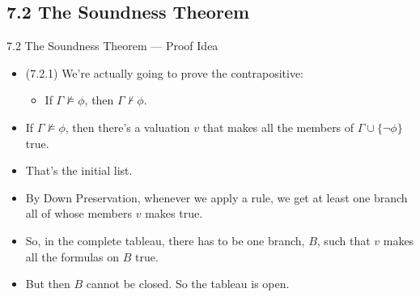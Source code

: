 \documentclass[../slides.tex]{subfiles}
\begin{document}
\subsection{7.2 The Soundness Theorem}

\begin{frame}{7.2 The Soundness Theorem --- Proof Idea}

	\begin{itemize}

		\item (7.2.1) We're actually going to prove the contrapositive:
		
			\begin{itemize}
			
				\item If $\Gamma\nvDash\phi$, then $\Gamma\nvdash\phi$.
			
			\end{itemize}
			
		\item If $\Gamma\nvDash\phi$, then there's a valuation $v$ that makes all the members of $\Gamma\cup\{\neg\phi\}$ true.
		
		\item That's the initial list. 
		
		
		\item By Down Preservation, whenever we apply a rule, we get at least one branch all of whose members $v$ makes true.
		
		\item So, in the complete tableau, there has to be one branch, $B$, such that $v$ makes all the formulas on $B$ true.

		\item But then $B$ cannot be closed. So the tableau is open.

	\end{itemize}

\end{frame}
\end{document}
